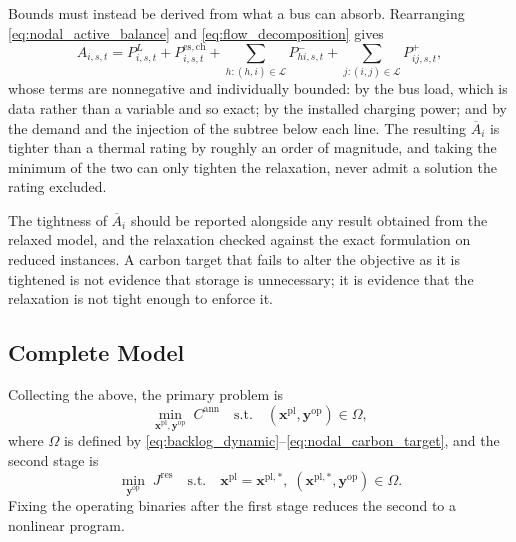 \documentclass[journal]{IEEEtran}
\begin{document}
Bounds must instead be derived from what a bus can absorb. Rearranging
\eqref{eq:nodal_active_balance} and \eqref{eq:flow_decomposition} gives
\begin{equation}
A_{i,s,t}
=P_{i,s,t}^{L}
+P_{i,s,t}^{\mathrm{es,ch}}
+\!\!\sum_{h:(h,i)\in\mathcal{L}}\!\!P_{hi,s,t}^{-}
+\!\!\sum_{j:(i,j)\in\mathcal{L}}\!\!P_{ij,s,t}^{+},
\label{eq:incoming_identity}
\end{equation}
whose terms are nonnegative and individually bounded: by the bus load,
which is data rather than a variable and so exact; by the installed
charging power; and by the demand and the injection of the subtree below
each line. The resulting $\overline{A}_i$ is tighter than a thermal
rating by roughly an order of magnitude, and taking the minimum of the
two can only tighten the relaxation, never admit a solution the rating
excluded.

The tightness of $\overline{A}_i$ should be reported alongside any result
obtained from the relaxed model, and the relaxation checked against the
exact formulation on reduced instances. A carbon target that fails to
alter the objective as it is tightened is not evidence that storage is
unnecessary; it is evidence that the relaxation is not tight enough to
enforce it.

\subsection{Complete Model}
\label{sec:complete_model}

Collecting the above, the primary problem is
\begin{equation}
\min_{\boldsymbol{x}^{\mathrm{pl}},\boldsymbol{y}^{\mathrm{op}}}
\;
C^{\mathrm{ann}}
\quad\mathrm{s.t.}\quad
(\boldsymbol{x}^{\mathrm{pl}},\boldsymbol{y}^{\mathrm{op}})\in\Omega,
\label{eq:compact_stage1}
\end{equation}
where $\Omega$ is defined by
\eqref{eq:backlog_dynamic}--\eqref{eq:nodal_carbon_target}, and the
second stage is
\begin{equation}
\min_{\boldsymbol{y}^{\mathrm{op}}}
\;
J^{\mathrm{res}}
\quad\mathrm{s.t.}\quad
\boldsymbol{x}^{\mathrm{pl}}=\boldsymbol{x}^{\mathrm{pl},*},\;
(\boldsymbol{x}^{\mathrm{pl},*},\boldsymbol{y}^{\mathrm{op}})\in\Omega.
\label{eq:compact_stage2}
\end{equation}
Fixing the operating binaries after the first stage reduces the second to
a nonlinear program.
\end{document}
